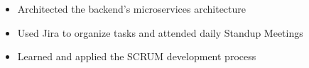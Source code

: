 \begin{itemize}
  \item Architected the backend's microservices architecture
  \item Used Jira to organize tasks and attended daily Standup Meetings
  \item Learned and applied the SCRUM development process
\end{itemize}
\vspace{4pt}
